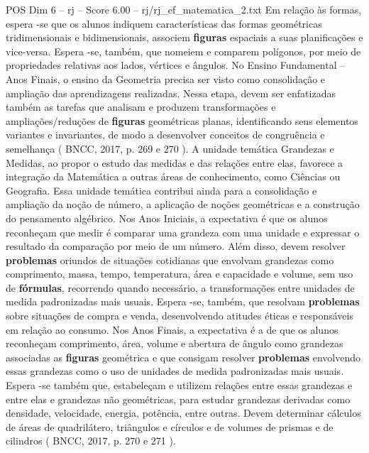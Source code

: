 \begin{textsample}{POS Dim 6 – rj – Score 6.00 – rj/rj\_ef\_matematica\_2.txt}
Em relação às formas, espera -se que os alunos indiquem características das formas geométricas tridimensionais e bidimensionais, associem \textbf{figuras} espaciais a suas planificações e vice-versa.
Espera -se, também, que nomeiem e comparem polígonos, por meio de propriedades relativas aos lados, vértices e ângulos.
No Ensino Fundamental – Anos Finais, o ensino da Geometria precisa ser visto como consolidação e ampliação das aprendizagens realizadas.
Nessa etapa, devem ser enfatizadas também as tarefas que analisam e produzem transformações e ampliações/reduções de \textbf{figuras} geométricas planas, identificando seus elementos variantes e invariantes, de modo a desenvolver conceitos de congruência e semelhança ( BNCC, 2017, p. 269 e 270 ).
A unidade temática Grandezas e Medidas, ao propor o estudo das medidas e das relações entre elas, favorece a integração da Matemática a outras áreas de conhecimento, como Ciências ou Geografia.
Essa unidade temática contribui ainda para a consolidação e ampliação da noção de número, a aplicação de noções geométricas e a construção do pensamento algébrico.
Nos Anos Iniciais, a expectativa é que os alunos reconheçam que medir é comparar uma grandeza com uma unidade e expressar o resultado da comparação por meio de um número.
Além disso, devem resolver \textbf{problemas} oriundos de situações cotidianas que envolvam grandezas como comprimento, massa, tempo, temperatura, área e capacidade e volume, sem uso de \textbf{fórmulas}, recorrendo quando necessário, a transformações entre unidades de medida padronizadas mais usuais.
Espera -se, também, que resolvam \textbf{problemas} sobre situações de compra e venda, desenvolvendo atitudes éticas e responsáveis em relação ao consumo.
Nos Anos Finais, a expectativa é a de que os alunos reconheçam comprimento, área, volume e abertura de ângulo como grandezas associadas as \textbf{figuras} geométrica e que consigam resolver \textbf{problemas} envolvendo essas grandezas como o uso de unidades de medida padronizadas mais usuais.
Espera -se também que, estabeleçam e utilizem relações entre essas grandezas e entre elas e grandezas não geométricas, para estudar grandezas derivadas como densidade, velocidade, energia, potência, entre outras.
Devem determinar cálculos de áreas de quadrilátero, triângulos e círculos e de volumes de prismas e de cilindros ( BNCC, 2017, p. 270 e 271 ).

\end{textsample}
